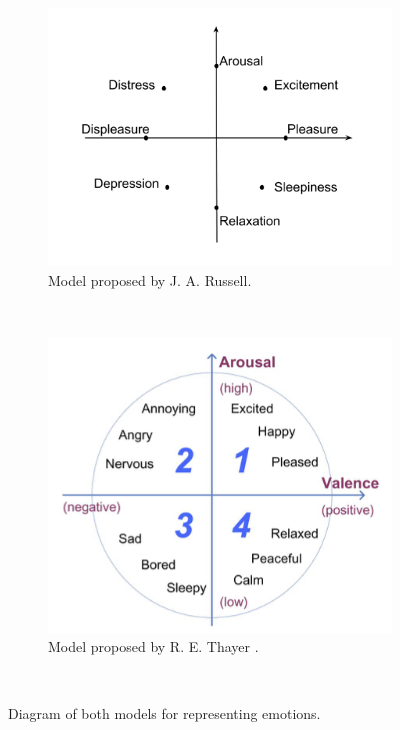 \begin{figure}
        \centering
        \begin{subfigure}[b]{0.47\textwidth}
                \includegraphics[width=\textwidth]{Figures/Russell}
                \caption{Model proposed by J. A. Russell.}
                \label{fig:Russell}
        \end{subfigure}%
        ~ %
        \begin{subfigure}[b]{0.47\textwidth}
                \includegraphics[width=\textwidth]{Figures/ThayersAV}
                \caption{Model proposed by R. E. Thayer \cite{mood}.}
                \label{fig:Thayer}
        \end{subfigure}
          \caption{Diagram of both models for representing emotions.}
        ~ %
        \label{fig:RussellThayer}
\end{figure}


